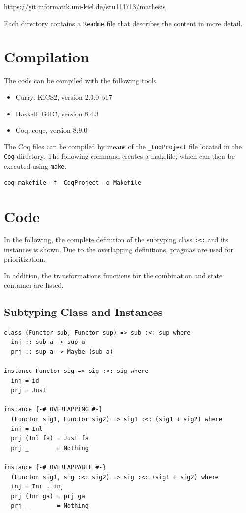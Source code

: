 \documentclass[a4paper, 11pt, fleqn, twoside, abstract=on]{scrreprt}
\newcommand{\hinl}[1]{\texttt{#1}}
\newcommand{\cinl}[1]{\texttt{#1}}
\begin{document}
\vspace*{.5cm}
\url{https://git.informatik.uni-kiel.de/stu114713/mathesis}
\vspace*{.5cm}

\noindent
Each directory contains a \texttt{Readme} file that describes the content in more detail.

\section{Compilation}

The code can be compiled with the following tools.

\begin{itemize}
\item Curry: KiCS2, version 2.0.0-b17
\item Haskell: GHC, version 8.4.3
\item Coq: coqc, version 8.9.0
\end{itemize}

The Coq files can be compiled by means of the \cinl{_CoqProject} file located in the \cinl{Coq} directory.
The following command creates a makefile, which can then be executed using \texttt{make}.

\begin{verbatim}
coq_makefile -f _CoqProject -o Makefile
\end{verbatim}

\section{Code}
In the following, the complete definition of the subtyping class \hinl{:<:} and its instances is shown.
Due to the overlapping definitions, pragmas are used for prioritization.
  
In addition, the transformations functions for the combination and state container are listed.
\subsection{Subtyping Class and Instances}
\label{ap:subtyping}
\begin{verbatim}
class (Functor sub, Functor sup) => sub :<: sup where
  inj :: sub a -> sup a
  prj :: sup a -> Maybe (sub a)

instance Functor sig => sig :<: sig where
  inj = id
  prj = Just

instance {-# OVERLAPPING #-}
  (Functor sig1, Functor sig2) => sig1 :<: (sig1 + sig2) where
  inj = Inl
  prj (Inl fa) = Just fa
  prj _        = Nothing

instance {-# OVERLAPPABLE #-}
  (Functor sig1, sig :<: sig2) => sig :<: (sig1 + sig2) where
  inj = Inr . inj
  prj (Inr ga) = prj ga
  prj _        = Nothing
\end{verbatim}
\end{document}
